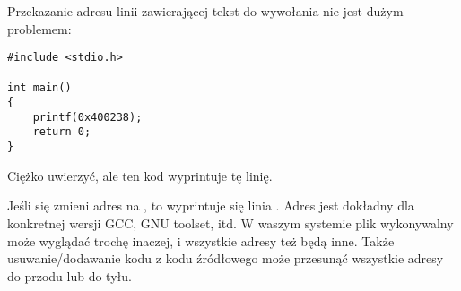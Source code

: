 Przekazanie adresu linii zawierającej tekst  do wywołania  nie jest dużym problemem:

\begin{lstlisting}[style=customc]
#include <stdio.h>

int main()
{
    printf(0x400238);
    return 0;
}
\end{lstlisting}

Ciężko uwierzyć, ale ten kod wyprintuje tę linię.

Jeśli się zmieni adres na , to wyprintuje się linia .
Adres jest dokładny dla konkretnej wersji GCC, GNU toolset, itd.
W waszym systemie plik wykonywalny może wyglądać trochę inaczej, i wszystkie adresy też będą inne.
Także usuwanie/dodawanie kodu z kodu źródłowego może przesunąć wszystkie adresy do przodu lub do tyłu.


